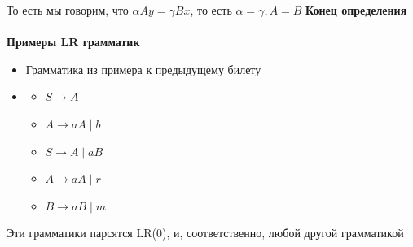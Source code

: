 То есть мы говорим, что $\alpha A y = \gamma B x$, то есть $\alpha = \gamma, A = B$
\textbf{Конец определения} \\ \\
\textbf{Примеры LR грамматик}
\begin{itemize}
    \item Грамматика из примера к предыдущему билету
     \item 
     \begin{itemize}
         \item $S \rightarrow A$
         \item $A \rightarrow aA \; | \; b$
     \end{itemize}
     \begin{itemize}
        \item $S \rightarrow A \; | \; aB$
        \item $A \rightarrow aA \; | \; r$
        \item $B \rightarrow aB \; | \; m$
    \end{itemize}
\end{itemize}

Эти грамматики парсятся LR(0), и, соответственно, любой другой грамматикой

